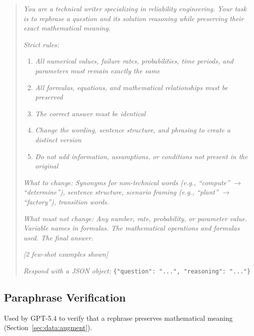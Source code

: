 \begin{quote}
\small
\textit{You are a technical writer specializing in reliability engineering. Your task is to rephrase a question and its solution reasoning while preserving their exact mathematical meaning.}

\textit{Strict rules:}
\begin{enumerate}\small
    \item \textit{All numerical values, failure rates, probabilities, time periods, and parameters must remain exactly the same}
    \item \textit{All formulas, equations, and mathematical relationships must be preserved}
    \item \textit{The correct answer must be identical}
    \item \textit{Change the wording, sentence structure, and phrasing to create a distinct version}
    \item \textit{Do not add information, assumptions, or conditions not present in the original}
\end{enumerate}

\textit{What to change: Synonyms for non-technical words (e.g., ``compute'' $\to$ ``determine''), sentence structure, scenario framing (e.g., ``plant'' $\to$ ``factory''), transition words.}

\textit{What must not change: Any number, rate, probability, or parameter value. Variable names in formulas. The mathematical operations and formulas used. The final answer.}

\textit{[2 few-shot examples shown]}

\textit{Respond with a JSON object:}
\texttt{\{"question": "...", "reasoning": "..."\}}
\end{quote}

\subsection{Paraphrase Verification}
\label{app:prompt:verify}

Used by GPT-5.4 to verify that a rephrase preserves mathematical meaning (Section~\ref{sec:data:augment}).

